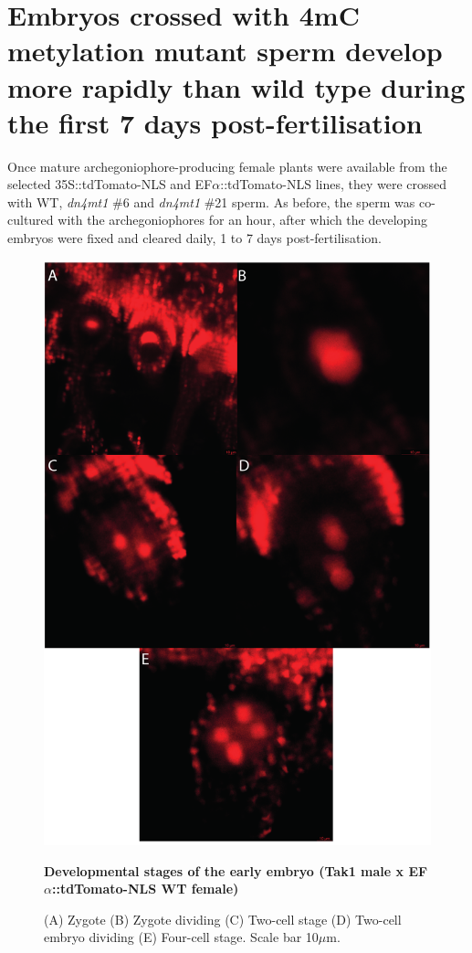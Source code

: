 \section{Embryos crossed with 4mC metylation mutant sperm develop more rapidly than wild type during the first 7 days post-fertilisation}

Once mature archegoniophore-producing female plants were available from the selected 35S::tdTomato-NLS and EF$\alpha$::tdTomato-NLS lines, they were crossed with WT, \textit{dn4mt1} \#6 and \textit{dn4mt1} \#21 sperm. As before, the sperm was co-cultured with the archegoniophores for an hour, after which the developing embryos were fixed and cleared daily, 1 to 7 days post-fertilisation. 

\begin{figure}[htbp!] 
\centering    
    \includegraphics[width=1\textwidth]{Chapter3/Figs/Figure10_Developmental_stages.pdf}
\caption{\textbf{Developmental stages of the early embryo (Tak1 male x EF$\alpha$::tdTomato-NLS WT female)}}
\label{fig:dev_stages}
\captionsetup{font=small}
    \caption*{(A) Zygote (B) Zygote dividing (C) Two-cell stage (D) Two-cell embryo dividing (E) Four-cell stage. Scale bar 10$\mu$m.}
\end{figure}

